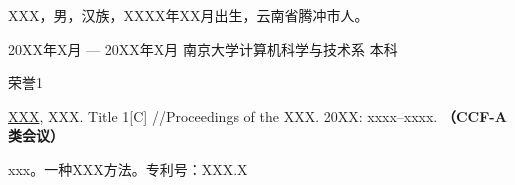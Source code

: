 \documentclass[macfonts,phd]{njuthesis}
\begin{document}
\backmatter
\begin{resume}
\begin{authorinfo}
\noindent XXX，男，汉族，XXXX年XX月出生，云南省腾冲市人。
\end{authorinfo}
\begin{education}
\item[20XX年X月 --- 20XX年X月] 南京大学计算机科学与技术系 \hfill 本科
\end{education}
\begin{award}
\item 荣誉1
\end{award}

\begin{publications}
\item \underline{XXX}, XXX. Title 1[C] //Proceedings of the XXX. 20XX: xxxx–xxxx. {\bf （CCF-A 类会议）}
\end{publications}
\begin{patent}
\item {xxx。}{一种XXX方法}。{专利号：XXX.X}
\end{patent}
\end{resume}

\makelicense

\end{document}

